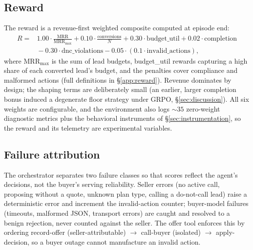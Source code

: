 \documentclass{article} %
\begin{document}
\subsection{Reward}
\label{sec:reward}
The reward is a revenue-first weighted composite computed at episode end:
\begin{equation*}
\begin{aligned}
R = {} & 1.00\cdot\frac{\mathrm{MRR}}{\mathrm{MRR}_{\max}} + 0.10\cdot\frac{\text{conversions}}{N}
  + 0.30\cdot\text{budget\_util} + 0.02\cdot\text{completion} \\
  & {}- 0.30\cdot\text{dnc\_violations} - 0.05\cdot(0.1\cdot\text{invalid\_actions}),
\end{aligned}
\end{equation*}
where $\mathrm{MRR}_{\max}$ is the sum of lead budgets, budget\_util rewards capturing a high share of each
converted lead's budget, and the penalties cover compliance and malformed actions (full definitions in
\S\ref{app:reward}). Revenue dominates by design; the shaping terms are deliberately small (an earlier, larger completion bonus induced
a degenerate floor strategy under GRPO, \S\ref{sec:discussion}). All six weights are configurable, and the
environment also logs ${\sim}35$ zero-weight diagnostic metrics plus the behavioral instruments of
\S\ref{sec:instrumentation}, so the reward and its telemetry are experimental variables.

\subsection{Failure attribution}
\label{sec:attribution}
The orchestrator separates two failure classes so that scores reflect the agent's decisions, not the buyer's
serving reliability. Seller errors (no active call, proposing without a quote, unknown plan type, calling a
do-not-call lead) raise a deterministic error and increment the invalid-action counter; buyer-model failures
(timeouts, malformed JSON, transport errors) are caught and resolved to a benign rejection, never counted against
the seller. The offer tool enforces this by ordering record-offer (seller-attributable) $\rightarrow$ call-buyer
(isolated) $\rightarrow$ apply-decision, so a buyer outage cannot manufacture an invalid action.
\end{document}

